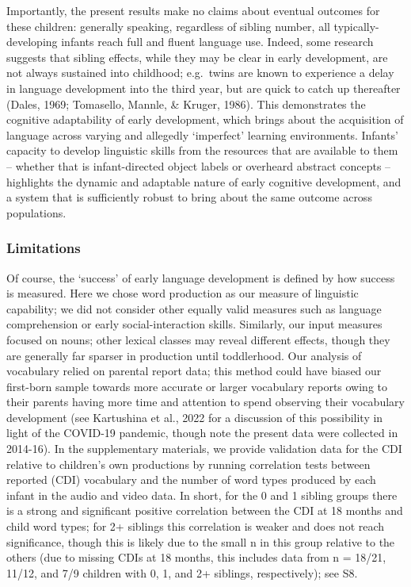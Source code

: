 \documentclass[
  man,floatsintext]{apa6}
\begin{document}
Importantly, the present results make no claims about eventual outcomes for these children: generally speaking, regardless of sibling number, all typically-developing infants reach full and fluent language use. Indeed, some research suggests that sibling effects, while they may be clear in early development, are not always sustained into childhood; e.g.~twins are known to experience a delay in language development into the third year, but are quick to catch up thereafter (Dales, 1969; Tomasello, Mannle, \& Kruger, 1986). This demonstrates the cognitive adaptability of early development, which brings about the acquisition of language across varying and allegedly `imperfect' learning environments. Infants' capacity to develop linguistic skills from the resources that are available to them -- whether that is infant-directed object labels or overheard abstract concepts -- highlights the dynamic and adaptable nature of early cognitive development, and a system that is sufficiently robust to bring about the same outcome across populations.

\hypertarget{limitations}{%
\subsubsection{Limitations}\label{limitations}}

Of course, the `success' of early language development is defined by how success is measured. Here we chose word production as our measure of linguistic capability; we did not consider other equally valid measures such as language comprehension or early social-interaction skills. Similarly, our input measures focused on nouns; other lexical classes may reveal different effects, though they are generally far sparser in production until toddlerhood. Our analysis of vocabulary relied on parental report data; this method could have biased our first-born sample towards more accurate or larger vocabulary reports owing to their parents having more time and attention to spend observing their vocabulary development (see Kartushina et al., 2022 for a discussion of this possibility in light of the COVID-19 pandemic, though note the present data were collected in 2014-16). In the supplementary materials, we provide validation data for the CDI relative to children's own productions by running correlation tests between reported (CDI) vocabulary and the number of word types produced by each infant in the audio and video data. In short, for the 0 and 1 sibling groups there is a strong and significant positive correlation between the CDI at 18 months and child word types; for 2+ siblings this correlation is weaker and does not reach significance, though this is likely due to the small n in this group relative to the others (due to missing CDIs at 18 months, this includes data from n = 18/21, 11/12, and 7/9 children with 0, 1, and 2+ siblings, respectively); see S8.
\end{document}
